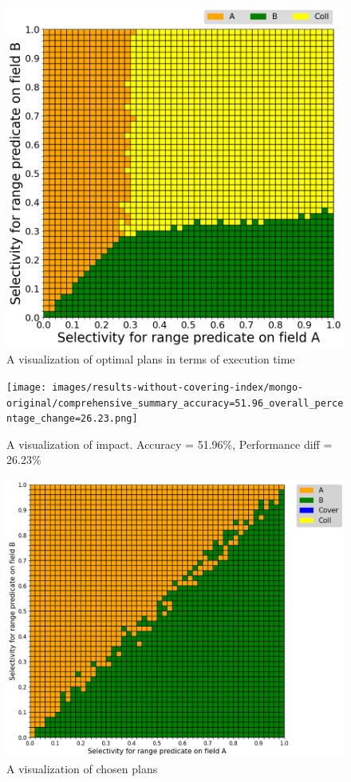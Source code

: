 \begin{figure}[htb]
    \centering
    \includegraphics[width=0.6\linewidth]{images/results-without-covering-index/mongo-original/comprehensive_practical_winner.png}
    \caption{A visualization of optimal plans in terms of execution time}
    \label{fig:mongo-with-coll-v0}
\end{figure}

\begin{figure}[htb]
    \centering
    \texttt{[image: images/results-without-covering-index/mongo-original/comprehensive\_summary\_accuracy=51.96\_overall\_percentage\_change=26.23.png]}
    \caption{A visualization of impact. Accuracy = 51.96\%, Performance diff = 26.23\%}
    \label{fig:mongo-with-fix-v0}
\end{figure}

\begin{figure}[htb]
    \centering
    \includegraphics[width=0.6\linewidth]{images/results-without-covering-index/mongo-with-coll/comprehensive_mongo_choice.png}
    \caption{A visualization of chosen plans}
    \label{fig:mongo-choice-v1}
\end{figure}

